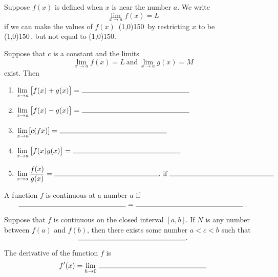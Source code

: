 \documentclass[12pt]{amsart}
\begin{document}
\begin{thm}[3 Points]
  Suppose \(f(x)\) is defined when \(x\) is near the number \(a\).
  We write
  \[\lim_{x \to a} f(x) = L\]
  if we can make the values of \(f(x)\)\ \line(1,0){150}\ by restricting \(x\) to be \vspace{.5in}\\
  \line(1,0){150}\,, but not equal to \line(1,0){150}.
\end{thm}

\begin{thm}[6 Points]
  Suppose that \(c\) is a constant and the limits
  \[\lim_{x \to a} f(x) = L\ \text{and}\ \lim_{x \to a} g(x) = M\]
  exist.
  Then
  \begin{enumerate}
  \item
    \(\displaystyle{\lim_{x \to a} \left[f(x) + g(x)\right] =\ \line(1,0){150}}\)
    \vspace{.25in}
  \item
    \(\displaystyle{\lim_{x \to a} \left[f(x) - g(x)\right] =\ \line(1,0){150}}\)
    \vspace{.25in}
  \item
    \(\displaystyle{\lim_{x \to a} [c(fx)] =\ \line(1,0){150}}\)
    \vspace{.25in}
  \item
    \(\displaystyle{\lim_{x \to a} \left[f(x)g(x)\right] =\ \line(1,0){150}}\)
    \vspace{.25in}
  \item
    \(\displaystyle{\lim_{x \to a} \frac{f(x)}{g(x)} =\ \line(1,0){150},\, \text{if}\ \line(1,0){150}}\)
    \vspace{.25in}
  \end{enumerate}
\end{thm}

\begin{thm}[2 Points]
  A function \(f\) is continuous at a number \(a\) if
  \vspace{.25in}
  \[\line(1,0){150}\ =\ \line(1,0){150}.\]
\end{thm}

\begin{thm}[1 Point]
  Suppose that \(f\) is continuous on the closed interval \([a,b]\).
  If \(N\) is any number between \(f(a)\) and \(f(b)\), then there exists some number \(a < c < b\) such that
  \vspace{.25in}
  \[\line(1,0){150}.\]
\end{thm}

\begin{thm}[1 Point]
  The derivative of the function \(f\) is
  \vspace{.5in}
  \[f^\prime(x) = \lim_{h \to 0}\ \line(1,0){150}\]
\end{thm}
\end{document}
